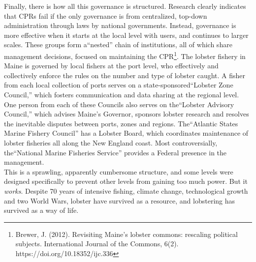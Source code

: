 \documentclass[amstex,12pt]{book}
\begin{document}
Finally, there is how all this governance is structured. Research clearly indicates that CPRs fail if the only governance is from centralized, top-down administration through laws by national governments. Instead, governance is more effective when  it starts at the local level with users, and continues to larger scales. These groups form a``nested'' chain of institutions, all of which share management decisions, focused on maintaining the CPR\footnote{Brewer, J. (2012). Revisiting Maine’s lobster commons: rescaling political subjects. International Journal of the Commons, 6(2). https://doi.org/10.18352/ijc.336}. The lobster fishery in Maine is governed by local fishers at the port level, who effectively and collectively enforce the rules on the number and type of lobster caught. A fisher from each local collection of ports serves on a state-sponsored``Lobster Zone Council,'' which fosters communication and data sharing at the regional level. One person from each of these Councils also serves on the``Lobster Advisory Council,'' which advises Maine's Governor, sponsors lobster research and resolves the inevitable disputes between ports, zones and regions. The``Atlantic States Marine Fishery Council'' has a Lobster Board, which coordinates maintenance of lobster fisheries all along the New England coast. Most controversially, the``National Marine Fisheries Service'' provides a Federal presence in the management.\\

This is a sprawling, apparently cumbersome structure, and some levels were designed specifically to prevent other levels from gaining too much power. But it \emph{works}. Despite 70 years of intensive fishing, climate change, technological growth and two World Wars, lobster have survived as a resource, and lobstering has survived as a way of life.  \\  
\end{document}
